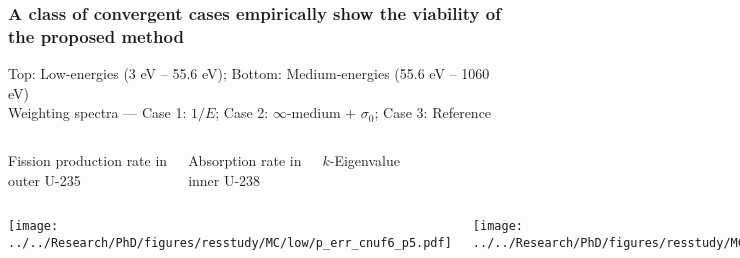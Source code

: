 \documentclass[compress,10pt]{beamer}
\begin{document}
\typeout{***********************************************************************************}

\begin{frame}
    \frametitle{A class of convergent cases empirically show the viability of the proposed method}

    \centering

    \vspace{-4mm}
    {\small Top: Low-energies (3 eV -- 55.6 eV); Bottom: Medium-energies (55.6 eV -- 1060 eV) } \\
    {\footnotesize Weighting spectra --- Case 1: $1/E$; Case 2: $\infty$-medium $+$ $\sigma_0$; Case 3: Reference} \\


    \begin{columns}[t]

        \centering

        {\footnotesize Fission production rate in\\ outer U-235}

        \centering

        {\footnotesize Absorption rate in\\ inner U-238}

        \centering

        {\footnotesize $k$-Eigenvalue}

    \end{columns}

    \begin{columns}[t]

        \centering

        {}\texttt{[image: ../../Research/PhD/figures/resstudy/MC/low/p\_err\_cnuf6\_p5.pdf]}

        \centering

        {}\texttt{[image: ../../Research/PhD/figures/resstudy/MC/low/p\_err\_cabs2\_p5.pdf]}

        \centering

        {}\texttt{[image: ../../Research/PhD/figures/resstudy/MC/low/p\_err\_keig\_p5.pdf]}


\end{columns}
\end{frame}
\end{document}
